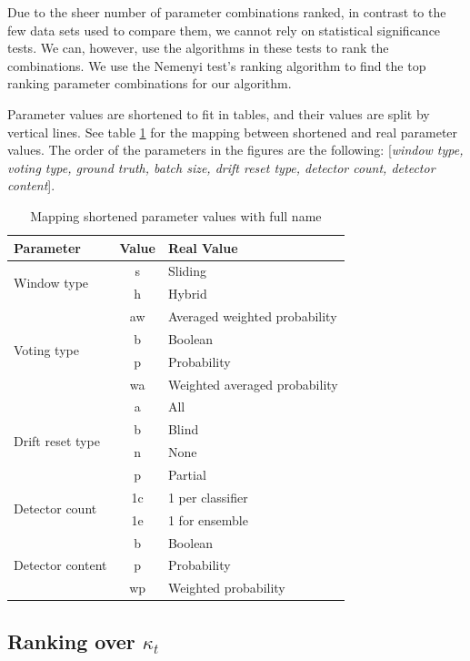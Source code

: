 Due to the sheer number of parameter combinations ranked, in contrast to the few data sets used to compare them, we cannot rely on statistical significance tests. We can, however, use the algorithms in these tests to rank the combinations. We use the Nemenyi test's ranking algorithm to find the top ranking parameter combinations for our algorithm.

Parameter values are shortened to fit in tables, and their values are split by vertical lines. See table \ref{table:ranking_parameter_values_mapping} for the mapping between shortened and real parameter values. The order of the parameters in the figures are the following: [\textit{window type, voting type, ground truth, batch size, drift reset type, detector count, detector content}].

\begin{table}[]
\centering
\caption{\label{table:ranking_parameter_values_mapping}Mapping shortened parameter values with full name}
\begin{tabular}{|l|c|l|}
\hline
\textbf{Parameter} & \textbf{Value} & \textbf{Real Value} \\ \hline
\multirow{2}{*}{Window type} & s & Sliding \\ \cline{2-3} 
 & h & Hybrid \\ \hline
\multirow{4}{*}{Voting type} & aw & Averaged weighted probability \\ \cline{2-3} 
 & b & Boolean \\ \cline{2-3} 
 & p & Probability \\ \cline{2-3} 
 & wa & Weighted averaged probability \\ \hline
\multirow{4}{*}{Drift reset type} & a & All \\ \cline{2-3} 
 & b & Blind \\ \cline{2-3} 
 & n & None \\ \cline{2-3} 
 & p & Partial \\ \hline
\multirow{2}{*}{Detector count} & 1c & 1 per classifier \\ \cline{2-3} 
 & 1e & 1 for ensemble \\ \hline
\multirow{3}{*}{Detector content} & b & Boolean \\ \cline{2-3} 
 & p & Probability \\ \cline{2-3} 
 & wp & Weighted probability \\ \hline
\end{tabular}
\end{table}

\subsection{Ranking over $\kappa_t$}

